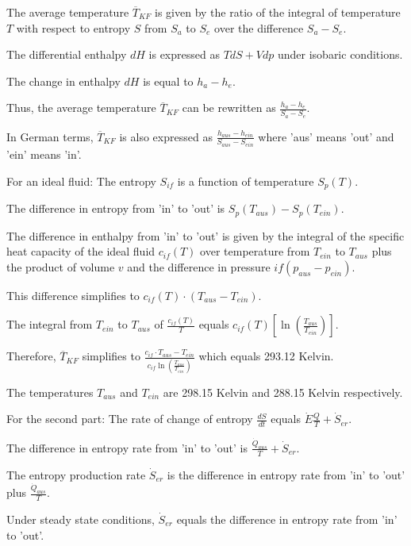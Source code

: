 The average temperature \( \overline{T}_{KF} \) is given by the ratio of the integral of temperature \( T \) with respect to entropy \( S \) from \( S_a \) to \( S_e \) over the difference \( S_a - S_e \).

The differential enthalpy \( dH \) is expressed as \( T dS + V dp \) under isobaric conditions.

The change in enthalpy \( dH \) is equal to \( h_a - h_e \).

Thus, the average temperature \( \overline{T}_{KF} \) can be rewritten as \( \frac{h_a - h_e}{S_a - S_e} \).

In German terms, \( \overline{T}_{KF} \) is also expressed as \( \frac{h_{aus} - h_{ein}}{S_{aus} - S_{ein}} \) where 'aus' means 'out' and 'ein' means 'in'.

For an ideal fluid:
The entropy \( S_{if} \) is a function of temperature \( S_p(T) \).

The difference in entropy from 'in' to 'out' is \( S_p(T_{aus}) - S_p(T_{ein}) \).

The difference in enthalpy from 'in' to 'out' is given by the integral of the specific heat capacity of the ideal fluid \( c_{if}(T) \) over temperature from \( T_{ein} \) to \( T_{aus} \) plus the product of volume \( v \) and the difference in pressure \( if(p_{aus} - p_{ein}) \).

This difference simplifies to \( c_{if}(T) \cdot (T_{aus} - T_{ein}) \).

The integral from \( T_{ein} \) to \( T_{aus} \) of \( \frac{c_{if}(T)}{T} \) equals \( c_{if}(T) \left[ \ln \left( \frac{T_{aus}}{T_{ein}} \right) \right] \).

Therefore, \( \overline{T}_{KF} \) simplifies to \( \frac{c_{if} \cdot T_{aus} - T_{ein}}{c_{if} \ln \left( \frac{T_{aus}}{T_{ein}} \right)} \) which equals 293.12 Kelvin.

The temperatures \( T_{aus} \) and \( T_{ein} \) are 298.15 Kelvin and 288.15 Kelvin respectively.

For the second part:
The rate of change of entropy \( \frac{dS}{dt} \) equals \( \dot{E} \frac{Q}{T} + \dot{S}_{er} \).

The difference in entropy rate from 'in' to 'out' is \( \frac{\dot{Q}_{aus}}{T} + \dot{S}_{er} \).

The entropy production rate \( \dot{S}_{er} \) is the difference in entropy rate from 'in' to 'out' plus \( \frac{\dot{Q}_{aus}}{T} \).

Under steady state conditions, \( \dot{S}_{er} \) equals the difference in entropy rate from 'in' to 'out'.

